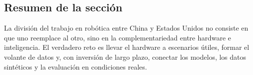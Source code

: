\subsection{Resumen de la sección}

La división del trabajo en robótica entre China y Estados Unidos no consiste en que uno reemplace al otro, sino en la complementariedad entre hardware e inteligencia. El verdadero reto es llevar el hardware a escenarios útiles, formar el volante de datos y, con inversión de largo plazo, conectar los modelos, los datos sintéticos y la evaluación en condiciones reales.

